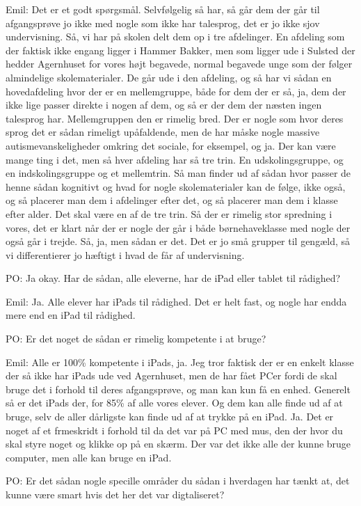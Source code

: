 Emil:
Det er et godt spørgsmål.
Selvfølgelig så har, så går dem der går til afgangsprøve jo ikke med nogle som ikke har talesprog, det er jo ikke sjov undervisning.
Så, vi har på skolen delt dem op i tre afdelinger.
En afdeling som der faktisk ikke engang ligger i Hammer Bakker, men som ligger ude i Sulsted der hedder Agernhuset for vores højt begavede, normal begavede unge som der følger almindelige skolematerialer.
De går ude i den afdeling, og så har vi sådan en hovedafdeling hvor der er en mellemgruppe, både for dem der er så, ja, dem der ikke lige passer direkte i nogen af dem, og så er der dem der næsten ingen talesprog har.
Mellemgruppen den er rimelig bred. 
Der er nogle som hvor deres sprog det er sådan rimeligt upåfaldende, men de har måske nogle massive autismevanskeligheder omkring det sociale, for eksempel, og ja.
Der kan være mange ting i det, men så hver afdeling har så tre trin.
En udskolingsgruppe, og en indskolingsgruppe og et mellemtrin. 
Så man finder ud af sådan hvor passer de henne sådan kognitivt og hvad for nogle skolematerialer kan de følge, ikke også, og så placerer man dem i afdelinger efter det, og så placerer man dem i klasse efter alder.
Det skal være en af de tre trin. 
Så der er rimelig stor spredning i vores, det er klart når der er nogle der går i både børnehaveklasse med nogle der også går i trejde.
Så, ja, men sådan er det.
Det er jo små grupper til gengæld, så vi differentierer jo hæftigt i hvad de får af undervisning.

PO:
Ja okay.
Har de sådan, alle eleverne, har de iPad eller tablet til rådighed?

Emil:
Ja.
Alle elever har iPads til rådighed. 
Det er helt fast, og nogle har endda mere end en iPad til rådighed.

PO:
Er det noget de sådan er rimelig kompetente i at bruge?

Emil: 
Alle er 100\% kompetente i iPads, ja.
Jeg tror faktisk der er en enkelt klasse der så ikke har iPads ude ved Agernhuset, men de har fået PCer fordi de skal bruge det i forhold til deres afgangsprøve, og man kan kun få en enhed.
Generelt så er det iPads der, for 85\% af alle vores elever. 
Og dem kan alle finde ud af at bruge, selv de aller dårligste kan finde ud af at trykke på en iPad.
Ja.
Det er noget af et frmeskridt i forhold til da det var på PC med mus, den der hvor du skal styre noget og klikke op på en skærm.
Der var det ikke alle der kunne bruge computer, men alle kan bruge en iPad.

PO: 
Er det sådan nogle specille områder du sådan i hverdagen har tænkt at, det kunne være smart hvis det her det var digtaliseret?

